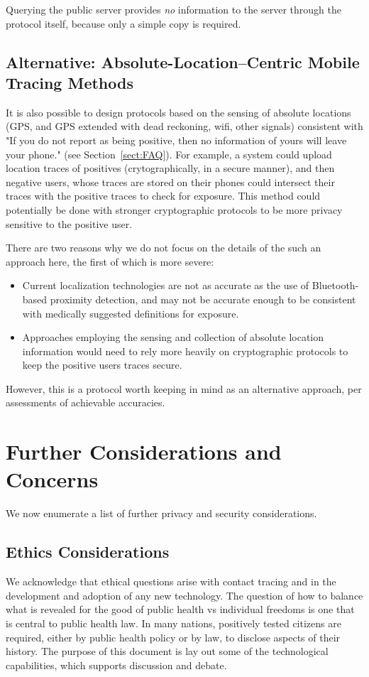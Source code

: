 \documentclass{article}
\begin{document}
Querying the public server provides \emph{no} information to the server through the protocol itself, because only a simple copy is required.  

\subsection{Alternative: Absolute-Location--Centric Mobile Tracing Methods}\label{sect:GPS}
It is also possible to design protocols based on the sensing of absolute locations (GPS, and GPS extended with dead reckoning, wifi, other signals) consistent with "If you do not report as being positive, then no information of yours will leave your phone." (see Section~\ref{sect:FAQ}).  For example, a system could upload location traces of positives (crytographically, in a secure manner), and then negative users, whose traces are stored on their phones could intersect their traces with the positive traces to check for exposure. This method could potentially be done with stronger cryptographic protocols to be more privacy sensitive to the positive user.

There are two reasons why we do not focus on the details of the such an approach here, the first of which is more severe:
\begin{itemize}
    \item Current localization technologies are not as accurate as the use of Bluetooth-based proximity detection, and may not be accurate enough to be consistent with medically suggested definitions for exposure.
    \item Approaches employing the sensing and collection of absolute location information would need to rely more heavily on cryptographic protocols to keep the positive users traces secure.
\end{itemize}
However, this is a protocol worth keeping in mind as an alternative approach, per assessments of achievable accuracies.

\section{Further Considerations and Concerns}
We now enumerate a list of further privacy and security considerations.

\subsection{Ethics Considerations}
We acknowledge that ethical questions arise with contact tracing and in the development and adoption of any new technology. The question of how to balance what is revealed for the good of public health vs individual freedoms is one that is central to public health law. In many nations, positively tested citizens are required, either by public health policy or by law, 
to disclose aspects of their history.  The purpose of this document is lay out some of the technological capabilities, which supports discussion and debate.
\end{document}
